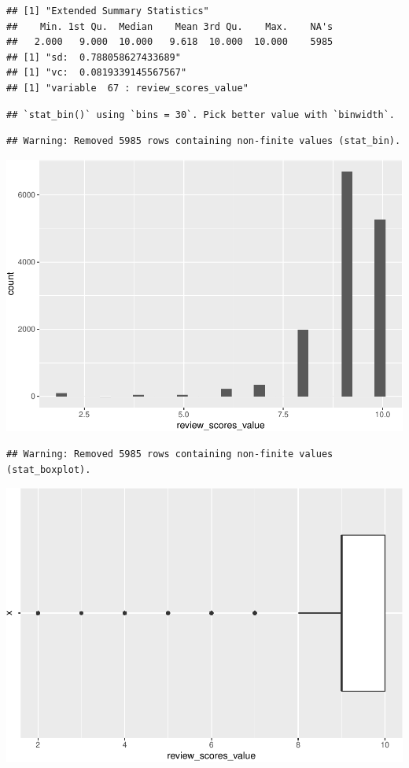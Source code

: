 \begin{verbatim}
## [1] "Extended Summary Statistics"
##    Min. 1st Qu.  Median    Mean 3rd Qu.    Max.    NA's 
##   2.000   9.000  10.000   9.618  10.000  10.000    5985 
## [1] "sd:  0.788058627433689"
## [1] "vc:  0.0819339145567567"
## [1] "variable  67 : review_scores_value"
\end{verbatim}

\begin{verbatim}
## `stat_bin()` using `bins = 30`. Pick better value with `binwidth`.
\end{verbatim}

\begin{verbatim}
## Warning: Removed 5985 rows containing non-finite values (stat_bin).
\end{verbatim}

\includegraphics{anal_files/figure-latex/unnamed-chunk-9-50.pdf}

\begin{verbatim}
## Warning: Removed 5985 rows containing non-finite values (stat_boxplot).
\end{verbatim}

\includegraphics{anal_files/figure-latex/unnamed-chunk-9-51.pdf}

